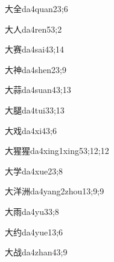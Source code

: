 \begin{verbete}{大全}{da4quan2}{3;6}
\end{verbete}

\begin{verbete}{大人}{da4ren5}{3;2}
\end{verbete}

\begin{verbete}{大赛}{da4sai4}{3;14}
\end{verbete}

\begin{verbete}{大神}{da4shen2}{3;9}
\end{verbete}

\begin{verbete}{大蒜}{da4suan4}{3;13}
\end{verbete}

\begin{verbete}{大腿}{da4tui3}{3;13}
\end{verbete}

\begin{verbete}{大戏}{da4xi4}{3;6}
\end{verbete}

\begin{verbete}{大猩猩}{da4xing1xing5}{3;12;12}
\end{verbete}

\begin{verbete}{大学}{da4xue2}{3;8}
\end{verbete}

\begin{verbete}{大洋洲}{da4yang2zhou1}{3;9;9}
\end{verbete}

\begin{verbete}{大雨}{da4yu3}{3;8}
\end{verbete}

\begin{verbete}{大约}{da4yue1}{3;6}
\end{verbete}

\begin{verbete}{大战}{da4zhan4}{3;9}
\end{verbete}

